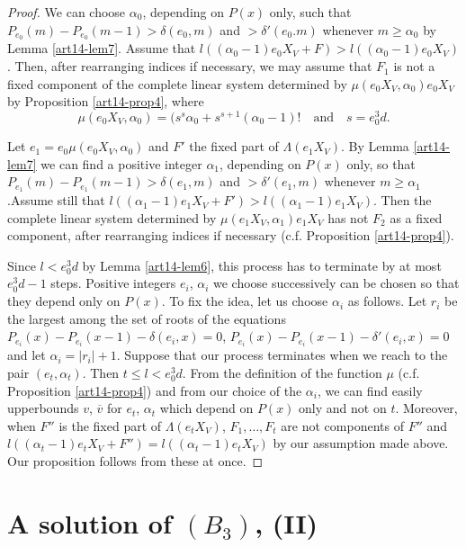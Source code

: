 \begin{proof}
We can choose $\alpha_{0}$, depending on $P(x)$ only, such that $P_{e_{0}}(m)-P_{e_{0}}(m-1)>\delta (e_{0},m)$ and $>\delta'(e_{0}.m)$ whenever $m\geq \alpha_{0}$ by Lemma \ref{art14-lem7}. Assume that $l((\alpha_{0}-1)e_{0}X_{V}+F)>l((\alpha_{0}-1)e_{0}X_{V})$. Then, after rearranging indices if necessary, we may assume that $F_{1}$ is not a fixed component of the complete linear system determined by $\mu(e_{0}X_{V},\alpha_{0})e_{0}X_{V}$ by Proposition \ref{art14-prop4}, where
$$
\mu (e_{0}X_{V}, \alpha_{0})=(s^{s}\alpha_{0}+s^{s+1}(\alpha_{0}-1)!\text{~~ and~~ } s=e^{3}_{0}d.
$$

Let $e_{1}=e_{0}\mu(e_{0}X_{V},\alpha_{0})$ and $F'$ the fixed part of $\Lambda (e_{1}X_{V})$. By Lemma \ref{art14-lem7} we can find a positive integer $\alpha_{1}$, depending on $P(x)$ only, so that $P_{e_{1}}(m)-P_{e_{1}}(m-1)>\delta (e_{1},m)$ and $>\delta'(e_{1},m)$ whenever $m\geq \alpha_{1}$.\pageoriginale Assume still that $l((\alpha_{1}-1)e_{1}X_{V}+F')>l((\alpha_{1}-1)e_{1}X_{V})$. Then the complete linear system determined by $\mu(e_{1}X_{V},\alpha_{1})e_{1}X_{V}$ has not $F_{2}$ as a fixed component, after rearranging indices if necessary (c.f. Proposition \ref{art14-prop4}).

Since $l<e^{3}_{0}d$ by Lemma \ref{art14-lem6}, this process has to terminate by at most $e^{3}_{0}d-1$ steps. Positive integers $e_{i}$, $\alpha_{i}$ we choose successively can be chosen so that they depend only on $P(x)$. To fix the idea, let us choose $\alpha_{i}$ as follows. Let $r_{i}$ be the largest among the set of roots of the equations $P_{e_{i}}(x)-P_{e_{i}}(x-1)-\delta (e_{i},x)=0$, $P_{e_{i}}(x)-P_{e_{i}}(x-1)-\delta'(e_{i},x)=0$ and let $\alpha_{i}=|r_{i}|+1$. Suppose that our process terminates when we reach to the pair $(e_{t},\alpha_{t})$. Then $t\leq l<e^{3}_{0}d$. From the definition of the function $\mu$ (c.f. Proposition \ref{art14-prop4}) and from our choice of the $\alpha_{i}$, we can find easily upperbounds $v$, $\overline{v}$ for $e_{t}$, $\alpha_{t}$ which depend on $P(x)$ only and not on $t$. Moreover, when $F''$ is the fixed part of $\Lambda(e_{t}X_{V})$, $F_{1},\ldots,F_{t}$ are not components of $F''$ and $l((\alpha_{t}-1)e_{t}X_{V}+F'')=l((\alpha_{t}-1)e_{t}X_{V})$ by our assumption made above. Our proposition follows from these at once.
\end{proof}

\section{A solution of $(B_{3})$, (II)}\label{art14-sec6}

